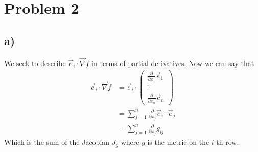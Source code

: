 \documentclass{article}
\theoremstyle{definition}
\begin{document}
\section*{Problem 2}
\subsection*{a)}
We seek to describe $\vec e_i \cdot \vec \nabla f$ in terms of partial derivatives.
Now we can say that 
\begin{align*}
  \vec e_i \cdot \vec \nabla f & = \vec e_i \cdot \begin{pmatrix}
    \frac{\partial}{\partial x_1}\vec e_1 \\
    \vdots \\
    \frac{\partial}{\partial x_n}\vec e_n
  \end{pmatrix}\\
  &= \sum_{j = 1}^n \frac{\partial}{\partial x_j}\vec e_i \cdot \vec e_j \\
  &= \sum_{j=1}^n \frac{\partial}{\partial x_j}g_{ij}
\end{align*}
Which is the sum of the Jacobian $J_g$ where $g$ is the metric on the $i$-th row.
\end{document}
